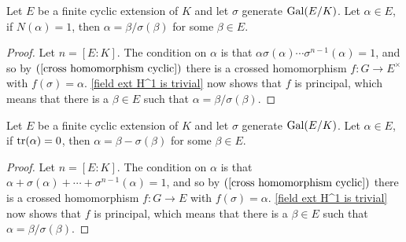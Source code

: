 \begin{corollary}
Let $E$ be a finite cyclic extension of $K$ and let $\sigma$ generate $\mathrm{Gal}(E/K)$. Let $\alpha\in E$, if $N(\alpha)=1$, then $\alpha=\beta/\sigma(\beta)$ for some $\beta\in E$.
\end{corollary}
\begin{proof}
Let $n=[E:K]$. The condition on $\alpha$ is that $\alpha\sigma(\alpha)\cdots\sigma^{n-1}(\alpha)=1$, and so by $(\ref{cross homomorphism cyclic})$ there is a crossed homomorphism $f:G\to E^{\times}$ with $f(\sigma)=\alpha$. \cref{field ext H^1 is trivial} now shows that $f$ is principal, which means that there is a $\beta\in E$ such that $\alpha=\beta/\sigma(\beta)$.
\end{proof}
\begin{corollary}
Let $E$ be a finite cyclic extension of $K$ and let $\sigma$ generate $\mathrm{Gal}(E/K)$. Let $\alpha\in E$, if $\mathrm{tr}(\alpha)=0$, then $\alpha=\beta-\sigma(\beta)$ for some $\beta\in E$.
\end{corollary}
\begin{proof}
Let $n=[E:K]$. The condition on $\alpha$ is that $\alpha+\sigma(\alpha)+\cdots+\sigma^{n-1}(\alpha)=1$, and so by $(\ref{cross homomorphism cyclic})$ there is a crossed homomorphism $f:G\to E$ with $f(\sigma)=\alpha$. \cref{field ext H^1 is trivial} now shows that $f$ is principal, which means that there is a $\beta\in E$ such that $\alpha=\beta/\sigma(\beta)$.
\end{proof}
